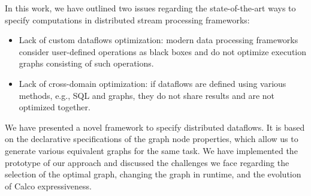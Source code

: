 In this work, we have outlined two issues regarding the state-of-the-art ways to specify computations in distributed stream processing frameworks:
\begin{itemize}
    \item Lack of custom dataflows optimization: modern data processing frameworks consider user-defined operations as black boxes and do not optimize execution graphs consisting of such operations.
    \item Lack of cross-domain optimization: if dataflows are defined using various methods, e.g., SQL and graphs, they do not share results and are not optimized together.
\end{itemize}

We have presented a novel framework to specify distributed dataflows.
It is based on the declarative specifications of the graph node properties, which allow us to generate various equivalent graphs for the same task.
We have implemented the prototype of our approach and discussed the challenges we face regarding the selection of the optimal graph, changing the graph in runtime, and the evolution of Calco expressiveness.